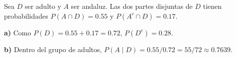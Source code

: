 Sea $D$ ser adulto y $A$ ser andaluz. Las dos partes
disjuntas de $D$ tienen probabilidades $P(A\cap D)=0.55$
y $P(A^c\cap D)=0.17$.

\textbf{a)} Como $P(D)=0.55+0.17=0.72$,
$P(D^c)=\boxed{0.28}$.

\textbf{b)} Dentro del grupo de adultos,
$P(A\mid D)=0.55/0.72=\boxed{55/72\approx0.7639}$.
